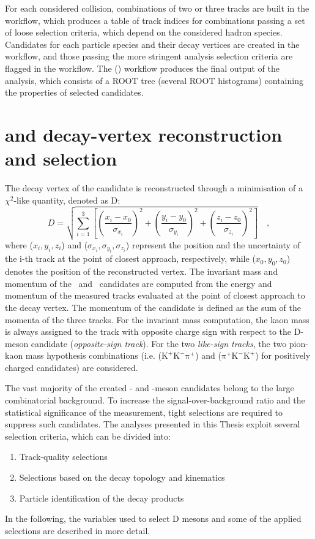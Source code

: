 For each considered collision, combinations of two or three tracks are built in the  workflow, which produces a table of track indices for combinations passing a set of loose selection criteria, which depend on the considered hadron species. Candidates for each particle species and their decay vertices are created in the  workflow, and those passing the more stringent analysis selection criteria are flagged in the  workflow. The  () workflow produces the final output of the analysis, which consists of a ROOT tree (several ROOT histograms) containing the properties of selected candidates.

\section{\texorpdfstring{\ds and \dpl decay-vertex reconstruction and selection}{Ds+ and D+ decay-vertex reconstruction and selection}}
 The decay vertex of the candidate is reconstructed through a minimisation of a $\chi^2$-like quantity, denoted as D:
\begin{equation*}
    D = \sqrt{\sum_{i=1}^3 \left[\left(\frac{x_i-x_0}{\sigma_{x_i}}\right)^2 + \left(\frac{y_i-y_0}{\sigma_{y_i}}\right)^2 +\left(\frac{z_i-z_0}{\sigma_{z_i}}\right)^2\right]}\quad ,
\end{equation*}
where ($x_i,y_i,z_i$) and ($\sigma_{x_i},\sigma_{y_i},\sigma_{z_i}$) represent the position and the uncertainty of the i-th track at the point of closest approach, respectively, while ($x_0,y_0,z_0$) denotes the position of the reconstructed vertex. The invariant mass and momentum of the \ds\ and \dpl\ candidates are computed from the energy and momentum of the measured tracks evaluated at the point of closest approach to the decay vertex. The momentum of the candidate is defined as the sum of the momenta of the three tracks. For the invariant mass computation, the kaon mass is always assigned to the track with opposite charge sign with respect to the D-meson candidate (\emph{opposite-sign track}). For the two \emph{like-sign tracks}, the two pion-kaon mass hypothesis combinations \big(i.e. ($\mathrm{K^+K^-\pi^+}$) and ($\mathrm{\pi^+K^-K^+}$) for positively charged candidates\big) are considered. 

The vast majority of the created \ds- and \dpl-meson candidates belong to the large combinatorial background. To increase the signal-over-background ratio and the statistical significance of the measurement, tight selections are required to suppress such candidates. The analyses presented in this Thesis exploit several selection criteria, which can be divided into:
\begin{enumerate}[i]
    \item Track-quality selections
    \item Selections based on the decay topology and kinematics
    \item Particle identification of the decay products
\end{enumerate}
In the following, the variables used to select D mesons and some of the applied selections are described in more detail.

